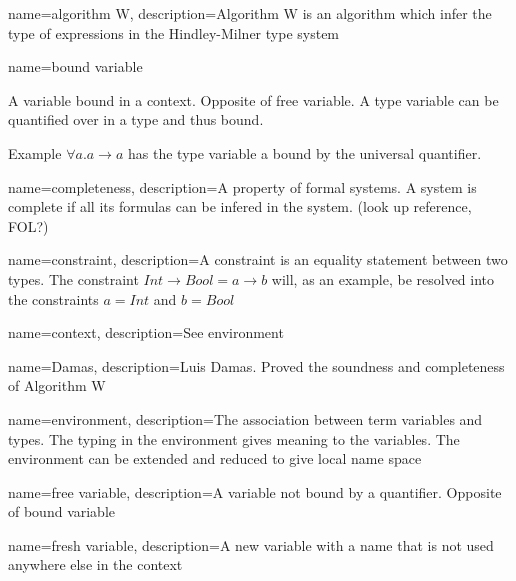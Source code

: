 
%


%




{ name={algorithm W},
  description={Algorithm W is an algorithm which infer the type of expressions in the Hindley-Milner type system}
}

{ name={bound variable} }
{A variable bound in a context. Opposite of free variable. A type variable can be quantified over in a type and thus bound.

Example $\forall a . a \to a$ has the type variable a bound by the universal quantifier.}

{ name={completeness},
  description={A property of formal systems. A system is complete if all its formulas can be infered in the system.
(look up reference, FOL?)}
}

{ name={constraint},
  description={A constraint is an equality statement between two types. The constraint $Int \to Bool = a \to b$ will, as an example, be resolved into the constraints $a = Int$ and $b = Bool$}
}

{ name={context},
  description={See environment}
}

{ name={Damas},
  description={Luis Damas. Proved the soundness and completeness of Algorithm W}
} %

{ name={environment},
  description={The association between term variables and types. The typing in the environment gives meaning to the variables. The environment can be extended and reduced to give local name space}
}

{ name={free variable},
  description={A variable not bound by a quantifier. Opposite of bound variable}
}

{ name={fresh variable},
  description={A new variable with a name that is not used anywhere else in the context}
}

